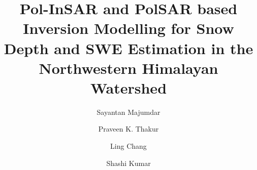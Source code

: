 \documentclass[review]{elsarticle}
\begin{document}
\begin{frontmatter}

\title{Pol-InSAR and PolSAR based Inversion Modelling for Snow Depth and SWE Estimation in the Northwestern Himalayan Watershed}


\author[itc,iirs]{Sayantan Majumdar }

\author[iirs]{Praveen K. Thakur}
\author[itc]{Ling Chang}
\author[iirs]{Shashi Kumar}

\address[itc]{Faculty of Geo-information Science and Earth Observation (ITC), University of Twente}
\address[iirs]{Indian Institute of Remote Sensing (IIRS), ISRO}


\end{frontmatter}
\end{document}
